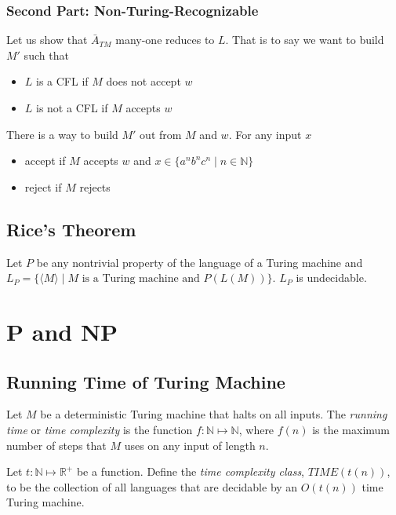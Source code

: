 \documentclass[11pt]{article}
\begin{document}
\subsubsection{Second Part: Non-Turing-Recognizable}

Let us show that $\bar{A}_{TM}$ many-one reduces to $L$. That is to say we want to build $M'$ such
that
\begin{itemize}
\item $L$ is a CFL if $M$ does not accept $w$
\item $L$ is not a CFL if $M$ accepts $w$
\end{itemize}

There is a way to build $M'$ out from $M$ and $w$. For any input $x$
\begin{itemize}
\item accept if $M$ accepts $w$ and $x \in \{a^nb^nc^n \mid n \in \mathbb{N}\}$
\item reject if $M$ rejects
\end{itemize}

\subsection{Rice's Theorem}

\begin{theorem}
Let $P$ be any nontrivial property of the language of a Turing machine and \\
$L_P = \{\langle M \rangle \mid M \text{ is a Turing machine and } P(L(M))\}$. $L_P$ is
undecidable.
\end{theorem}

\section{P and NP}

\subsection{Running Time of Turing Machine}

\begin{definition}
Let $M$ be a deterministic Turing machine that halts on all inputs. The \emph{running time} or
\emph{time complexity} is the function $f: \mathbb{N} \mapsto \mathbb{N}$, where $f(n)$ is the
maximum number of steps that $M$ uses on any input of length $n$.
\end{definition}

\begin{definition}
Let $t: \mathbb{N} \mapsto \mathbb{R}^+$ be a function. Define the \emph{time complexity class},
$TIME(t(n))$, to be the collection of all languages that are decidable by an $O(t(n))$ time Turing
machine.
\end{definition}
\end{document}
